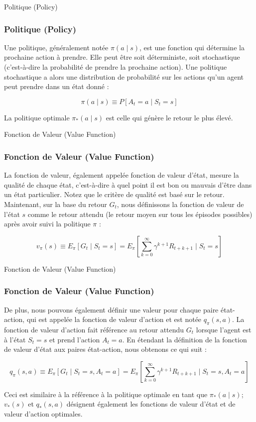 \documentclass[serif, aspectratio=169]{beamer}
\begin{document}
\begin{frame}{Politique (Policy)}
	\frametitle{Politique (Policy)}
	
	Une politique, généralement notée \( \pi(a \mid s) \), est une fonction qui détermine la prochaine action à prendre. Elle peut être soit déterministe, soit stochastique (c'est-à-dire la probabilité de prendre la prochaine action). Une politique stochastique a alors une distribution de probabilité sur les actions qu'un agent peut prendre dans un état donné :
	
	\[
	\pi(a \mid s) \equiv P[A_t = a \mid S_t = s]
	\]
	
	\vspace{10pt}
	
	La politique optimale \( \pi_*(a \mid s) \) est celle qui génère le retour le plus élevé.
	
\end{frame}


\begin{frame}{Fonction de Valeur (Value Function)}
	\frametitle{Fonction de Valeur (Value Function)}
	
	La fonction de valeur, également appelée fonction de valeur d'état, mesure la qualité de chaque état, c'est-à-dire à quel point il est bon ou mauvais d'être dans un état particulier. Notez que le critère de qualité est basé sur le retour. Maintenant, sur la base du retour \( G_t \), nous définissons la fonction de valeur de l'état \( s \) comme le retour attendu (le retour moyen sur tous les épisodes possibles) après avoir suivi la politique \( \pi \) :
	
	\vspace{10pt}
	
	\[
	v_\pi(s) \equiv E_\pi[G_t \mid S_t = s] = E_\pi\left[\sum_{k=0}^{\infty} \gamma^{k+1} R_{t+k+1} \mid S_t = s\right]
	\]
	
\end{frame}


\begin{frame}{Fonction de Valeur (Value Function)}
	\frametitle{Fonction de Valeur (Value Function)}
	
	De plus, nous pouvons également définir une valeur pour chaque paire état-action, qui est appelée la fonction de valeur d'action et est notée \( q_\pi(s, a) \). La fonction de valeur d'action fait référence au retour attendu \( G_t \) lorsque l'agent est à l'état \( S_t = s \) et prend l'action \( A_t = a \). En étendant la définition de la fonction de valeur d'état aux paires état-action, nous obtenons ce qui suit :
	
	\[
	q_\pi(s, a) \equiv E_\pi[G_t \mid S_t = s, A_t = a] = E_\pi\left[\sum_{k=0}^{\infty} \gamma^{k+1} R_{t+k+1} \mid S_t = s, A_t = a\right]
	\]
	
	Ceci est similaire à la référence à la politique optimale en tant que \( \pi_*(a \mid s) \); \( v_*(s) \) et \( q_*(s, a) \) désignent également les fonctions de valeur d'état et de valeur d'action optimales.
	
\end{frame}
\end{document}

